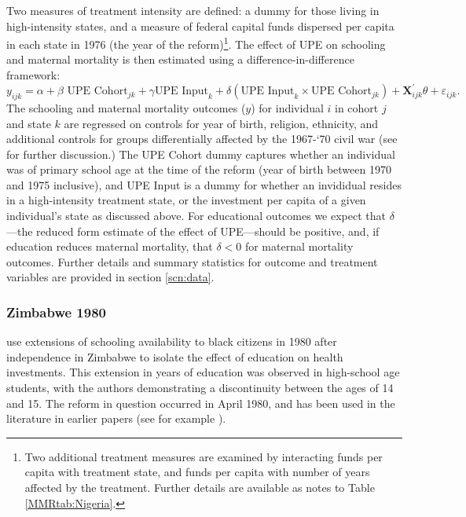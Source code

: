 \documentclass{article}[12pt,subeqn]
\begin{document}
\begin{spacing}{1.4}
Two measures of treatment intensity are defined: a dummy for those living in 
high-intensity states, and a measure of federal capital funds dispersed per capita 
in each state in 1976 (the year of the reform)\footnote{Two additional treatment 
measures are examined by interacting funds per capita with treatment state, and 
funds per capita with number of years affected by the treatment. Further details 
are available as notes to Table \ref{MMRtab:Nigeria}.}.  The effect of UPE on 
schooling and maternal mortality is then estimated using a difference-in-difference 
framework:
\begin{equation}
 \label{eqn:Nigeria}
  y_{ijk}=\alpha + \beta \text{ UPE Cohort}_{jk}+\gamma \text{UPE Input}_k+
   \delta(\text{UPE Input}_k\times\text{UPE Cohort}_{jk})+
   \textbf{X}^\prime_{ijk}\theta+\varepsilon_{ijk}.
\end{equation}
The schooling and maternal mortality outcomes ($y$) for individual $i$ in cohort 
$j$ and state $k$ are regressed on controls for year of birth, religion, 
ethnicity, and additional controls for groups differentially affected by the 
1967-`70 civil war (see \citet{Akreshetal2012} for further discussion.)  The UPE 
Cohort dummy captures whether an individual was of primary school age at the time 
of the reform (year of birth between 1970 and 1975 inclusive), and UPE Input is a 
dummy for whether an invididual resides in a high-intensity treatment state, or 
the investment per capita of a given individual's state as discussed above.  For 
educational outcomes we expect that $\delta$---the reduced form estimate of the 
effect of UPE---should be positive, and, if education reduces maternal mortality, 
that $\delta<0$ for maternal mortality outcomes.  Further details and summary 
statistics for outcome and treatment variables are provided in section 
\ref{scn:data}.

\subsubsection{Zimbabwe 1980}
\label{ssscn:empiricsZimbabwe}
\citet{AgueroBharawadj2011} use extensions of schooling availability to black 
citizens in 1980 after independence in Zimbabwe to isolate the effect of 
education on health investments. This extension in years of education was 
observed in high-school age students, with the authors demonstrating a 
discontinuity between the ages of 14 and 15.  The reform in question occurred in 
April 1980, and has been used in the literature in earlier papers (see for 
example \citet{Edwards1995}).


\end{spacing}
\end{document}
